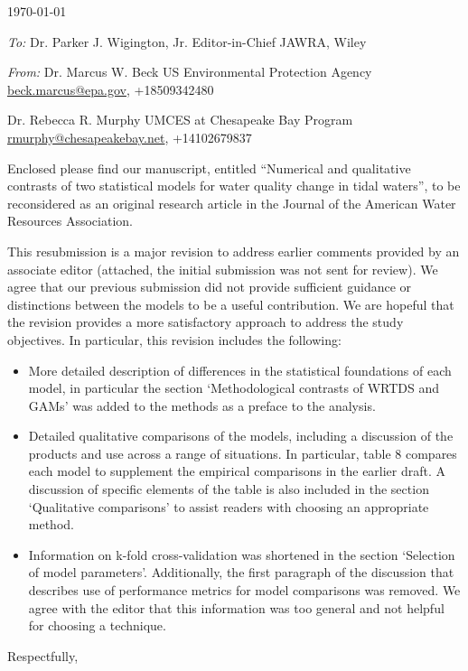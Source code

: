 \documentclass[a4paper,12pt]{article}
\begin{document}
\renewcommand{\rmdefault}{ptm}
\pagestyle{empty} 

\setlength{\parindent}{0mm} 
\setlength{\parskip}{5mm}

\begin{flushright}
\today
\end{flushright}

\emph{To:}\newline
Dr. Parker J. Wigington, Jr.\newline
Editor-in-Chief\newline
JAWRA, Wiley

\emph{From:}\newline
Dr. Marcus W. Beck\newline
US Environmental Protection Agency\newline
\href{mailto:beck.marcus@epa.gov}{beck.marcus@epa.gov}, +18509342480

Dr. Rebecca R. Murphy\newline
UMCES at Chesapeake Bay Program\newline
\href{mailto:rmurphy@chesapeakebay.net}{rmurphy@chesapeakebay.net}, +14102679837 \vspace{14.5pt}

Enclosed please find our manuscript, entitled ``Numerical and qualitative contrasts of two statistical models for water quality change in tidal waters'', to be reconsidered as an original research article in the Journal of the American Water Resources Association.  

This resubmission is a major revision to address earlier comments provided by an associate editor (attached, the initial submission was not sent for review).  We agree that our previous submission did not provide sufficient guidance or distinctions between the models to be a useful contribution.  We are hopeful that the revision provides a more satisfactory approach to address the study objectives.  In particular, this revision includes the following: 
\begin{itemize}
\item More detailed description of differences in the statistical foundations of each model, in particular the section `Methodological contrasts of WRTDS and GAMs' was added to the methods as a preface to the analysis.  
\item Detailed qualitative comparisons of the models, including a discussion of the products and use across a range of situations.  In particular, table 8 compares each model to supplement the empirical comparisons in the earlier draft.  A discussion of specific elements of the table is also included in the section `Qualitative comparisons' to assist readers with choosing an appropriate method.
\item Information on k-fold cross-validation was shortened in the section `Selection of model parameters'.  Additionally, the first paragraph of the discussion that describes use of performance metrics for model comparisons was removed.  We agree with the editor that this information was too general and not helpful for choosing a technique.
\end{itemize}
\hspace{4.5in}Respectfully,
\end{document}
